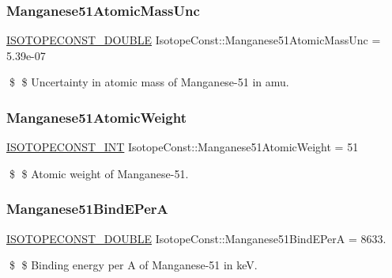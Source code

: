 \subsubsection{\texorpdfstring{Manganese51\+Atomic\+Mass\+Unc}{Manganese51AtomicMassUnc}}
{\footnotesize\ttfamily \mbox{\hyperlink{group___isotope_const-_macros_ga8f45a7272ce02c0b4c65c44636ed719a}{I\+S\+O\+T\+O\+P\+E\+C\+O\+N\+S\+T\+\_\+\+D\+O\+U\+B\+LE}} Isotope\+Const\+::\+Manganese51\+Atomic\+Mass\+Unc = 5.\+39e-\/07}

\$ \$ Uncertainty in atomic mass of Manganese-\/51 in amu. \mbox{\label{group___isotope_const-_manganese-_mn51_gadb3220985fa9a116a96cba7005105b9a}} 
\subsubsection{\texorpdfstring{Manganese51\+Atomic\+Weight}{Manganese51AtomicWeight}}
{\footnotesize\ttfamily \mbox{\hyperlink{group___isotope_const-_macros_ga5f18360b3e99483a35c32d789e62621c}{I\+S\+O\+T\+O\+P\+E\+C\+O\+N\+S\+T\+\_\+\+I\+NT}} Isotope\+Const\+::\+Manganese51\+Atomic\+Weight = 51}

\$ \$ Atomic weight of Manganese-\/51. \mbox{\label{group___isotope_const-_manganese-_mn51_ga2a2cadf754b6b2ec59f0d026ae78136d}} 
\subsubsection{\texorpdfstring{Manganese51\+Bind\+E\+PerA}{Manganese51BindEPerA}}
{\footnotesize\ttfamily \mbox{\hyperlink{group___isotope_const-_macros_ga8f45a7272ce02c0b4c65c44636ed719a}{I\+S\+O\+T\+O\+P\+E\+C\+O\+N\+S\+T\+\_\+\+D\+O\+U\+B\+LE}} Isotope\+Const\+::\+Manganese51\+Bind\+E\+PerA = 8633.}

\$ \$ Binding energy per A of Manganese-\/51 in keV. \mbox{\label{group___isotope_const-_manganese-_mn51_gacd47a0dac2a8b1d0c168d107d6fba62c}} 
